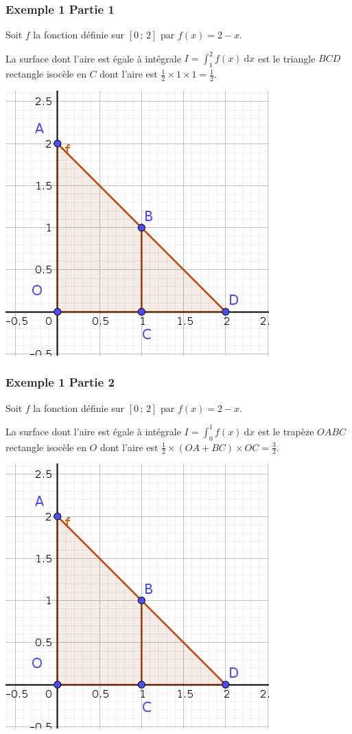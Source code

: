 \documentclass[11pt, hyperref={urlcolor=red,%
            linkcolor=blue, %
            colorlinks=true}]{beamer}
\newcommand{\Interff}[2]{\left[#1\, ;\, #2\right]}
\newcommand{\dx}{\ensuremath{\text{d}x}}		%
\newcommand{\integralex}[3]{\int_{#1}^{#2} #3 \ \dx}
\begin{document}
\begin{frame}
\frametitle{Exemple 1 Partie 1}
\label{exemple1}

Soit $f$ la fonction définie sur $\Interff{0}{2}$ par $f(x)=2-x$.

La surface dont l'aire est égale à  intégrale  $I=\integralex{1}{2}{f(x)}$ est le triangle $BCD$  rectangle isocèle en $C$  dont l'aire est $\frac{1}{2} \times 1 \times 1=\frac{1}{2}$.

\begin{center}
\includegraphics[scale=0.4]{images/exemple1.png}
\end{center}

\end{frame}

\begin{frame}
\frametitle{Exemple 1 Partie 2}
Soit $f$ la fonction définie sur $\Interff{0}{2}$ par $f(x)=2-x$.

La surface dont l'aire est égale à  intégrale  $I=\integralex{0}{1}{f(x)}$ est le trapèze $OABC$  rectangle isocèle en $O$  dont l'aire est $\frac{1}{2} \times ( OA + BC) \times OC = \frac{3}{2}$.

\begin{center}
\includegraphics[scale=0.4]{images/exemple1.png}
\end{center}

\end{frame}
\end{document}
